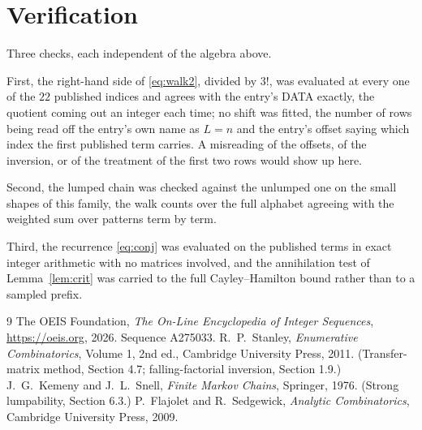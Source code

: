 \documentclass[11pt,a4paper]{article}
\theoremstyle{plain}
\theoremstyle{definition}
\begin{document}
\section{Verification}

Three checks, each independent of the algebra above.

First, the right-hand side of \eqref{eq:walk2}, divided by $3!$, was evaluated at every
one of the $22$ published indices and agrees with the entry's DATA exactly, the quotient
coming out an integer each time; no shift was fitted, the number of rows being read off the
entry's own name as $L=n$ and the entry's offset saying which index the first published
term carries. A misreading of the offsets, of the inversion, or of the treatment of the first
two rows would show up here.

Second, the lumped chain was checked against the unlumped one on the small shapes of this
family, the walk counts over the full alphabet agreeing with the weighted sum over patterns
term by term.

Third, the recurrence \eqref{eq:conj} was evaluated on the published terms in exact integer
arithmetic with no matrices involved, and the annihilation test of Lemma~\ref{lem:crit} was
carried to the full Cayley--Hamilton bound rather than to a sampled prefix.

\begin{thebibliography}{9}
 The OEIS Foundation, \emph{The On-Line Encyclopedia of Integer
Sequences}, \url{https://oeis.org}, 2026. Sequence A275033.
 R.~P.~Stanley, \emph{Enumerative Combinatorics}, Volume 1, 2nd ed.,
Cambridge University Press, 2011. (Transfer-matrix method, Section 4.7; falling-factorial
inversion, Section 1.9.)
 J.~G.~Kemeny and J.~L.~Snell, \emph{Finite Markov Chains}, Springer,
1976. (Strong lumpability, Section 6.3.)
 P.~Flajolet and R.~Sedgewick, \emph{Analytic Combinatorics}, Cambridge
University Press, 2009.
\end{thebibliography}
\end{document}
